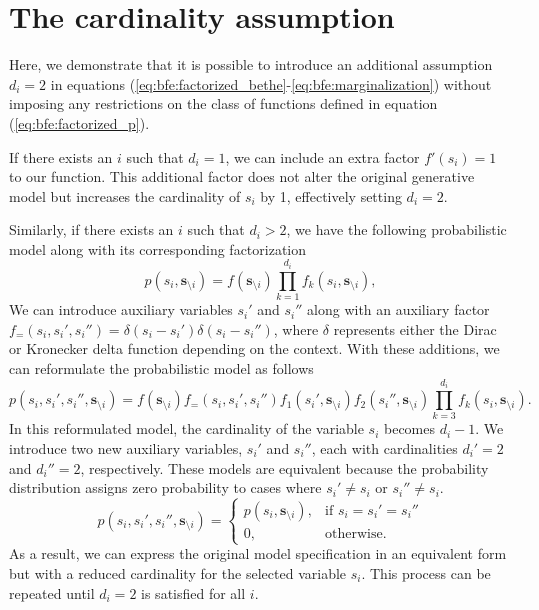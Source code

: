 \section{The cardinality assumption}\label{appendix:proofs:cardinality_a_i_2}

Here, we demonstrate that it is possible to introduce an additional assumption $d_i = 2$ in
equations (\ref{eq:bfe:factorized_bethe}-\ref{eq:bfe:marginalization}) without imposing any
restrictions on the class of functions defined in equation (\ref{eq:bfe:factorized_p}).

If there exists an $i$ such that $d_i = 1$, we can include an extra factor $f'(s_i) = 1$ to
our function.
This additional factor does not alter the original generative model but increases the
cardinality of $s_i$ by 1, effectively setting $d_i = 2$.

Similarly, if there exists an $i$ such that $d_i > 2$, we have the following probabilistic
model along with its corresponding factorization \begin{equation}
  p(s_i, \bm{s}_{\setminus i}) = f(\bm{s}_{\setminus i}) \prod_{k = 1}^{d_i} f_k(s_i, \bm{s}_{\setminus i}),
\end{equation}
We can introduce auxiliary variables $s_i'$ and $s_i''$ along with an auxiliary factor
$f_{=}(s_i, s_i', s_i'') = \delta(s_i - s_i')\delta(s_i - s_i'')$, where $\delta$ represents
either the Dirac or Kronecker delta function depending on the context.
With these additions, we can reformulate the probabilistic model as follows
\begin{equation}
  p(s_i, s_i', s_i'', \bm{s}_{\setminus i}) = 
    f(\bm{s}_{\setminus i}) 
    f_{=}(s_i, s_i', s_i'') 
    f_{1}(s_i', \bm{s}_{\setminus i})
    f_{2}(s_i'', \bm{s}_{\setminus i})
    \prod_{k = 3}^{d_i} f_k(s_i, \bm{s}_{\setminus i}).
\end{equation} In this reformulated model, the cardinality of the variable $s_i$
becomes $d_i - 1$.
We introduce two new auxiliary variables, $s_i'$ and $s_i''$, each with cardinalities $d_{i}'
  = 2$ and $d_{i}'' = 2$, respectively.
These models are equivalent because the probability distribution assigns zero probability to
cases where $s_i' \neq s_i$ or $s_i'' \neq s_i$.
\begin{equation}
  p(s_i, s_i', s_i'', \bm{s}_{\setminus i}) = 
    \begin{cases}
        p(s_i, \bm{s}_{\setminus i}),& \text{if } s_i = s_i' = s_i'' \\
        0,              & \text{otherwise}.
    \end{cases}
\end{equation}
As a result, we can express the original model specification in an equivalent form but with a
reduced cardinality for the selected variable $s_i$.
This process can be repeated until $d_i = 2$ is satisfied for all $i$.
